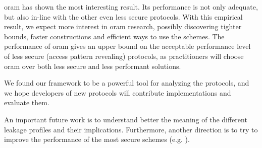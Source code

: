 	\acrshort{oram} has shown the most interesting result.
	Its performance is not only adequate, but also in-line with the other even less secure protocols.
	With this empirical result, we expect more interest in \acrshort{oram} research, possibly discovering tighter bounds, faster constructions and efficient ways to use the schemes.
	The performance of \acrshort{oram} gives an upper bound on the acceptable performance level of less secure (access pattern revealing) protocols, as practitioners will choose \acrshort{oram} over both less secure and less performant solutions.

	We found our framework to be a powerful tool for analyzing the protocols, and we hope developers of new protocols will contribute implementations and evaluate them.

	An important future work is to understand better the meaning of the different leakage profiles and their implications.
	Furthermore, another direction is to try to improve the performance of the most secure schemes (e.g. \cite{parameter-hiding-ore}). %
